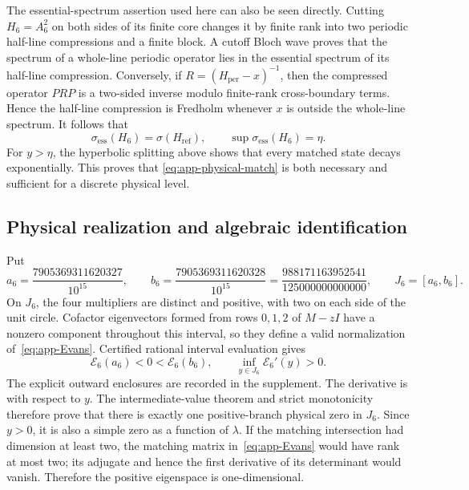The essential-spectrum assertion used here can also be seen directly.
Cutting \(H_6=A_6^2\) on both sides of its finite core changes it by finite
rank into two periodic half-line compressions and a finite block.  A cutoff
Bloch wave proves that the spectrum of a whole-line periodic operator lies
in the essential spectrum of its half-line compression.  Conversely, if
\(R=(H_{\mathrm{per}}-x)^{-1}\), then the compressed operator \(PRP\) is a
two-sided inverse modulo finite-rank cross-boundary terms.  Hence the
half-line compression is Fredholm whenever \(x\) is outside the whole-line
spectrum.  It follows that
\[
 \sigma_{\mathrm{ess}}(H_6)=\sigma(H_{\mathrm{ref}}),
 \qquad \sup\sigma_{\mathrm{ess}}(H_6)=\eta.
\]
For \(y>\eta\), the hyperbolic splitting above shows that every matched
state decays exponentially.  This proves that
\eqref{eq:app-physical-match} is both necessary and sufficient for a
discrete physical level.

\subsection{Physical realization and algebraic identification}
\label{appsubsec:c6-identification}

Put
\[
 a_6=\frac{7905369311620327}{10^{15}},\qquad
 b_6=\frac{7905369311620328}{10^{15}}
     =\frac{988171163952541}{125000000000000},
 \qquad J_6=[a_6,b_6].
\]
On \(J_6\), the four multipliers are distinct and positive, with two on
each side of the unit circle.  Cofactor eigenvectors formed from rows
\(0,1,2\) of \(M-zI\) have a nonzero component throughout this interval,
so they define a valid normalization of~\eqref{eq:app-Evans}. Certified
rational interval evaluation gives
\[
 \mathcal E_6(a_6)<0<\mathcal E_6(b_6),
 \qquad
 \inf_{y\in J_6}\mathcal E_6'(y)>0.
\]
The explicit outward enclosures are recorded in the supplement. The
derivative is with respect to \(y\). The intermediate-value theorem and
strict monotonicity therefore prove that there is exactly
one positive-branch physical zero in \(J_6\).  Since \(y>0\), it is also a
simple zero as a function of \(\lambda\).  If the matching intersection had
dimension at least two, the matching matrix in~\eqref{eq:app-Evans} would
have rank at most two; its adjugate and hence the first derivative of its
determinant would vanish.  Therefore the positive eigenspace is
one-dimensional.

